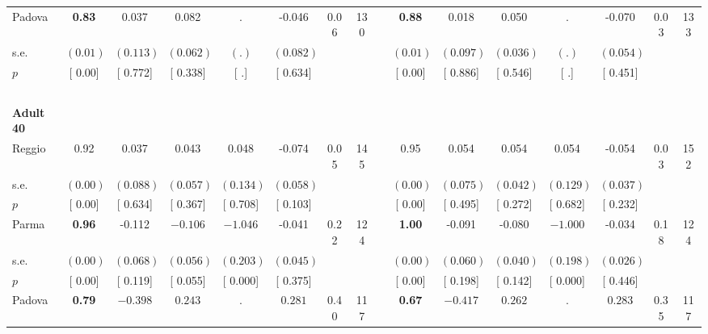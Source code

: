 \begin{longtable}{L{8em} c c c c c c c p{1em} c c c c c c c}
\quad \quad \quad Padova& \textbf{     0.83} &     0.037 &     0.082 &         . &    -0.046 &      0.06 &       130 & & \textbf{     0.88} &     0.018 &     0.050 &         . &    -0.070 &      0.03 &       133  \\*
\quad \quad \quad \quad s.e.& $ (     0.01)$ & $ (    0.113)$ & $ (    0.062)$ & $ (        .)$ & $ (    0.082)$ & & & & $ (     0.01)$ & $ (    0.097)$ & $ (    0.036)$ & $ (        .)$ & $ (    0.054)$ & &  \\*
\quad \quad \quad \quad $ p$ & [     0.00] & [    0.772] & [    0.338] & [        .] & [    0.634] & & & & [     0.00] & [    0.886] & [    0.546] & [        .] & [    0.451] & &  \\[1em]
~\\[1em]
\quad \quad \textbf{Adult 40} & & & & & & & & & & & & & & & \\* 
\quad \quad \quad Reggio& 0.92 &     0.037 &     0.043 &     0.048 &    -0.074 &      0.05 &       145 & & 0.95 &     0.054 &     0.054 &     0.054 &    -0.054 &      0.03 &       152  \\*
\quad \quad \quad \quad s.e.& $ (     0.00)$ & $ (    0.088)$ & $ (    0.057)$ & $ (    0.134)$ & $ (    0.058)$ & & & & $ (     0.00)$ & $ (    0.075)$ & $ (    0.042)$ & $ (    0.129)$ & $ (    0.037)$ & &  \\*
\quad \quad \quad \quad $ p$ & [     0.00] & [    0.634] & [    0.367] & [    0.708] & [    0.103] & & & & [     0.00] & [    0.495] & [    0.272] & [    0.682] & [    0.232] & &  \\[1em]
\quad \quad \quad Parma& \textbf{     0.96} &    -0.112 & $ \mathbf{   -0.106}$ & $ \mathbf{   -1.046}$ &    -0.041 &      0.22 &       124 & & \textbf{     1.00} &    -0.091 &    -0.080 & $ \mathbf{   -1.000}$ &    -0.034 &      0.18 &       124  \\*
\quad \quad \quad \quad s.e.& $ (     0.00)$ & $ (    0.068)$ & $ (    0.056)$ & $ (    0.203)$ & $ (    0.045)$ & & & & $ (     0.00)$ & $ (    0.060)$ & $ (    0.040)$ & $ (    0.198)$ & $ (    0.026)$ & &  \\*
\quad \quad \quad \quad $ p$ & [     0.00] & [    0.119] & [    0.055] & [    0.000] & [    0.375] & & & & [     0.00] & [    0.198] & [    0.142] & [    0.000] & [    0.446] & &  \\[1em]
\quad \quad \quad Padova& \textbf{     0.79} & $ \mathbf{   -0.398}$ & $ \mathbf{    0.243}$ &         . & $ \mathbf{    0.281}$ &      0.40 &       117 & & \textbf{     0.67} & $ \mathbf{   -0.417}$ & $ \mathbf{    0.262}$ &         . & $ \mathbf{    0.283}$ &      0.35 &       117  \\*

\end{longtable}
